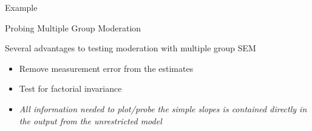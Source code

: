 \documentclass{beamer}
\newcommand{\va}[0]{\vspace{12pt}}
\newcommand{\vb}[0]{\vspace{6pt}}
\begin{document}
\begin{frame}[allowframebreaks]{Example}



\pagebreak



\pagebreak



\pagebreak



\pagebreak



\pagebreak



\pagebreak



\pagebreak



\pagebreak



\pagebreak



\pagebreak



\end{frame}



\begin{frame}{Probing Multiple Group Moderation}
  
  Several advantages to testing moderation with multiple group SEM
  \va
  \begin{itemize}
    \item Remove measurement error from the estimates
      \vb
    \item Test for factorial invariance
      \vb
    \item \textit{All information needed to plot/probe the simple
      slopes is contained directly in the output from the unrestricted
      model}
  \end{itemize}
  
\end{frame}
\end{document}
